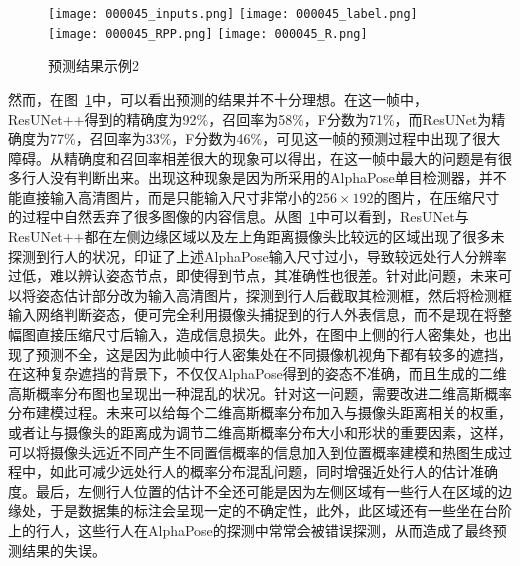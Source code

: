 \begin{figure}[H]
    \centering
      {\texttt{[image: 000045\_inputs.png]}}
      {\texttt{[image: 000045\_label.png]}}
      {\texttt{[image: 000045\_RPP.png]}}
      {\texttt{[image: 000045\_R.png]}}
    \caption{预测结果示例2}
    \label{failure1}
\end{figure}
然而，在图~\ref{failure1}中，可以看出预测的结果并不十分理想。在这一帧中，ResUNet++得到的精确度为92\%，召回率为58\%，F分数为71\%，而ResUNet为精确度为77\%，召回率为33\%，F分数为46\%，可见这一帧的预测过程中出现了很大障碍。从精确度和召回率相差很大的现象可以得出，在这一帧中最大的问题是有很多行人没有判断出来。出现这种现象是因为所采用的AlphaPose单目检测器，并不能直接输入高清图片，而是只能输入尺寸非常小的$256\times 192$的图片，在压缩尺寸的过程中自然丢弃了很多图像的内容信息。从图~\ref{failure1}中可以看到，ResUNet与ResUNet++都在左侧边缘区域以及左上角距离摄像头比较远的区域出现了很多未探测到行人的状况，印证了上述AlphaPose输入尺寸过小，导致较远处行人分辨率过低，难以辨认姿态节点，即使得到节点，其准确性也很差。针对此问题，未来可以将姿态估计部分改为输入高清图片，探测到行人后截取其检测框，然后将检测框输入网络判断姿态，便可完全利用摄像头捕捉到的行人外表信息，而不是现在将整幅图直接压缩尺寸后输入，造成信息损失。此外，在图中上侧的行人密集处，也出现了预测不全，这是因为此帧中行人密集处在不同摄像机视角下都有较多的遮挡，在这种复杂遮挡的背景下，不仅仅AlphaPose得到的姿态不准确，而且生成的二维高斯概率分布图也呈现出一种混乱的状况。针对这一问题，需要改进二维高斯概率分布建模过程。未来可以给每个二维高斯概率分布加入与摄像头距离相关的权重，或者让与摄像头的距离成为调节二维高斯概率分布大小和形状的重要因素，这样，可以将摄像头远近不同产生不同置信概率的信息加入到位置概率建模和热图生成过程中，如此可减少远处行人的概率分布混乱问题，同时增强近处行人的估计准确度。最后，左侧行人位置的估计不全还可能是因为左侧区域有一些行人在区域的边缘处，于是数据集的标注会呈现一定的不确定性，此外，此区域还有一些坐在台阶上的行人，这些行人在AlphaPose的探测中常常会被错误探测，从而造成了最终预测结果的失误。

